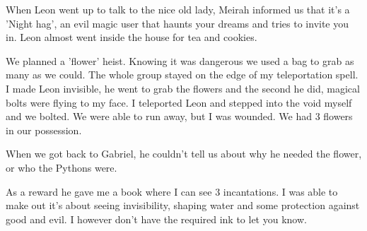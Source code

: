 When Leon went up to talk to the nice old lady, Meirah informed us that it's a 'Night hag', an evil magic user that haunts your dreams and tries to invite you in. Leon almost went inside the house for tea and cookies.

We planned a 'flower' heist. Knowing it was dangerous we used a bag to grab as many as we could. The whole group stayed on the edge of my teleportation spell. I made Leon invisible, he went to grab the flowers and the second he did, magical bolts were flying to my face. I teleported Leon and stepped into the void myself and we bolted. We were able to run away, but I was wounded. We had 3 flowers in our possession.

When we got back to Gabriel, he couldn't tell us about why he needed the flower, or who the Pythons were.

As a reward he gave me a book where I can see 3 incantations. I was able to make out it's about seeing invisibility, shaping water and some protection against good and evil. I however don't have the required ink to let you know.